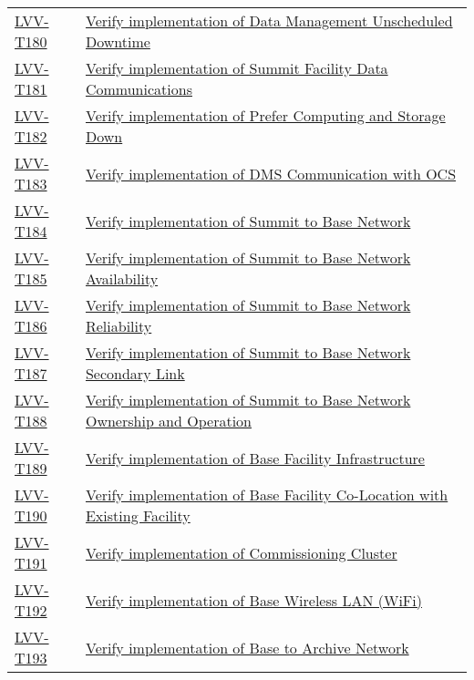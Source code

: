 \begin{longtable}[]{p{3cm}p{13cm}}
    \hyperref[lvv-t180]{LVV-T180} &
    \href{https://jira.lsstcorp.org/secure/Tests.jspa\#/testCase/LVV-T180}{Verify implementation of Data Management Unscheduled Downtime} \tabularnewline
    \hyperref[lvv-t181]{LVV-T181} &
    \href{https://jira.lsstcorp.org/secure/Tests.jspa\#/testCase/LVV-T181}{Verify implementation of Summit Facility Data Communications} \tabularnewline
    \hyperref[lvv-t182]{LVV-T182} &
    \href{https://jira.lsstcorp.org/secure/Tests.jspa\#/testCase/LVV-T182}{Verify implementation of Prefer Computing and Storage Down} \tabularnewline
    \hyperref[lvv-t183]{LVV-T183} &
    \href{https://jira.lsstcorp.org/secure/Tests.jspa\#/testCase/LVV-T183}{Verify implementation of DMS Communication with OCS} \tabularnewline
    \hyperref[lvv-t184]{LVV-T184} &
    \href{https://jira.lsstcorp.org/secure/Tests.jspa\#/testCase/LVV-T184}{Verify implementation of Summit to Base Network} \tabularnewline
    \hyperref[lvv-t185]{LVV-T185} &
    \href{https://jira.lsstcorp.org/secure/Tests.jspa\#/testCase/LVV-T185}{Verify implementation of Summit to Base Network Availability} \tabularnewline
    \hyperref[lvv-t186]{LVV-T186} &
    \href{https://jira.lsstcorp.org/secure/Tests.jspa\#/testCase/LVV-T186}{Verify implementation of Summit to Base Network Reliability} \tabularnewline
    \hyperref[lvv-t187]{LVV-T187} &
    \href{https://jira.lsstcorp.org/secure/Tests.jspa\#/testCase/LVV-T187}{Verify implementation of Summit to Base Network Secondary Link} \tabularnewline
    \hyperref[lvv-t188]{LVV-T188} &
    \href{https://jira.lsstcorp.org/secure/Tests.jspa\#/testCase/LVV-T188}{Verify implementation of Summit to Base Network Ownership and Operation} \tabularnewline
    \hyperref[lvv-t189]{LVV-T189} &
    \href{https://jira.lsstcorp.org/secure/Tests.jspa\#/testCase/LVV-T189}{Verify implementation of Base Facility Infrastructure} \tabularnewline
    \hyperref[lvv-t190]{LVV-T190} &
    \href{https://jira.lsstcorp.org/secure/Tests.jspa\#/testCase/LVV-T190}{Verify implementation of Base Facility Co-Location with Existing Facility} \tabularnewline
    \hyperref[lvv-t191]{LVV-T191} &
    \href{https://jira.lsstcorp.org/secure/Tests.jspa\#/testCase/LVV-T191}{Verify implementation of Commissioning Cluster} \tabularnewline
    \hyperref[lvv-t192]{LVV-T192} &
    \href{https://jira.lsstcorp.org/secure/Tests.jspa\#/testCase/LVV-T192}{Verify implementation of Base Wireless LAN (WiFi)} \tabularnewline
    \hyperref[lvv-t193]{LVV-T193} &
    \href{https://jira.lsstcorp.org/secure/Tests.jspa\#/testCase/LVV-T193}{Verify implementation of Base to Archive Network} \tabularnewline

\end{longtable}
